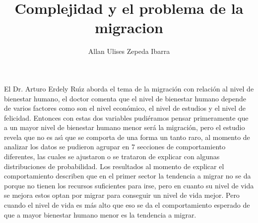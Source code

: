 \documentclass[a4paper,10pt]{article}
\title{Complejidad y el problema de la migracion}
\author{Allan Ulises Zepeda Ibarra}
\begin{document}
\maketitle

El Dr. Arturo Erdely Ru\'{\i}z aborda el tema de la migraci\'on con relaci\'on al nivel de bienestar humano, el doctor comenta que el nivel de bienestar humano 
depende de varios factores como son el nivel econ\'omico, el nivel de estudios y el nivel de felicidad. Entonces con estas dos variables 
pudi\'eramos pensar primeramente que a un mayor nivel de bienestar humano menor ser\'a la migraci\'on, pero el estudio revela que no es as\'{\i} 
que se comporta de una forma un tanto raro, al momento de analizar los datos se pudieron agrupar en 7 secciones de comportamiento 
diferentes, las cuales se ajustaron o se trataron de explicar con algunas distribuciones de probabilidad. Los resultados al momento de 
explicar el comportamiento describen que en el primer sector la tendencia a migrar no se da porque no tienen los recursos suficientes 
para irse, pero en cuanto su nivel de vida se mejora estos optan por migrar para conseguir un nivel de vida mejor. Pero cuando el nivel 
de vida es m\'as alto que eso se da el comportamiento esperado de que a mayor bienestar humano menor es la tendencia a migrar.
\end{document}
